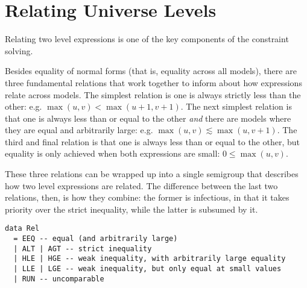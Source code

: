 \documentclass[11pt, twoside, reqno]{book}
\DeclareMathOperator{\imax}{imax}
\begin{document}
%
%


\section{Relating Universe Levels}
\label{rel-uni-lvl}

Relating two level expressions is one of the key components of the constraint solving.

Besides equality of normal forms (that is, equality across all models), there are three fundamental relations that work together to inform about how expressions relate across models.
The simplest relation is one is always strictly less than the other: e.g. \(\max(u,v) < \max(u+1,v+1)\).
The next simplest relation is that one is always less than or equal to the other \emph{and} there are models where they are equal and arbitrarily large: e.g. \(\max(u,v) \lesssim \max(u,v+1)\).
The third and final relation is that one is always less than or equal to the other, but equality is only achieved when both expressions are small: \(0 \leqslant \max(u,v)\).

These three relations can be wrapped up into a single semigroup that describes how two level expressions are related.
The difference between the last two relations, then, is how they combine: the former is infectious, in that it takes priority over the strict inequality, while the latter is subsumed by it.

\begin{verbatim}
data Rel
  = EEQ -- equal (and arbitrarily large)
  | ALT | AGT -- strict inequality
  | HLE | HGE -- weak inequality, with arbitrarily large equality
  | LLE | LGE -- weak inequality, but only equal at small values
  | RUN -- uncomparable
\end{verbatim}
\end{document}
